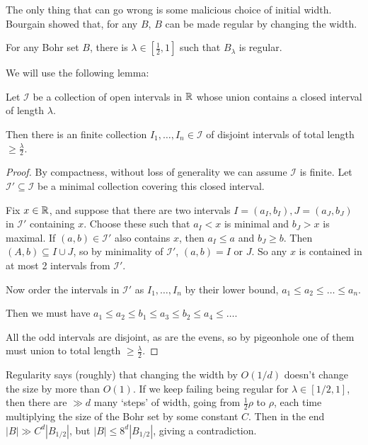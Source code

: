 \documentclass[10pt,a4paper]{article}
\begin{document}
The only thing that can go wrong is some malicious choice of initial width. Bourgain showed that, for any $B$, $B$ can be made regular by changing the width.
\begin{lemma}
  For any Bohr set $B$, there is $\lambda \in [\frac12, 1]$ such that $B_\lambda$ is regular.
\end{lemma}
We will use the following lemma:
\begin{lemma}
  Let $\mathcal{I}$ be a collection of open intervals in $\mathbb{R}$ whose union contains a closed interval of length $\lambda$.

  Then there is an finite collection $I_1, \ldots, I_n \in \mathcal{I}$ of disjoint intervals of total length $\geq \frac{\lambda}{2}$.
\end{lemma}
\begin{proof}
  By compactness, without loss of generality we can assume $\mathcal{I}$ is finite. Let $\mathcal{I}' \subseteq \mathcal{I}$ be a minimal collection covering this closed interval.

  Fix $x \in \mathbb{R}$, and suppose that there are two intervals $I = (a_I, b_I), J = (a_J, b_J)$ in $\mathcal{I}'$ containing $x$. Choose these such that $a_I <x$ is minimal and $b_J > x$ is maximal. If $(a,b) \in \mathcal{I}'$ also contains $x$, then $a_I \leq a$ and $b_J \geq b$. Then $(A,b) \subseteq I \cup J$, so by minimality of $\mathcal{I}'$, $(a,b) = I$ or $J$. So any $x$ is contained in at most 2 intervals from $\mathcal{I}'$.

  Now order the intervals in $\mathcal{I}'$ as $I_1, \ldots, I_n$ by their lower bound, $a_1 \leq a_2 \leq \ldots \leq a_n$.

  Then we must have $a_1 \leq a_2 \leq b_1 \leq a_3 \leq b_2 \leq a_4 \leq \ldots$.

  All the odd intervals are disjoint, as are the evens, so by pigeonhole one of them must union to total length $\geq \frac{\lambda}{2}$.
\end{proof}
Regularity says (roughly) that changing the width by $O(1/d)$ doesn't change the size by more than $O(1)$. If we keep failing being regular for $\lambda \in [1/2,1]$, then there are $\gg d$ many `steps' of width, going from $\frac{1}{2}\rho$ to $\rho$, each time multiplying the size of the Bohr set by some constant $C$. Then in the end $|B| \gg C^d |B_{1/2}|$, but $|B| \leq 8^d |B_{1/2}|$, giving a contradiction.
\end{document}
